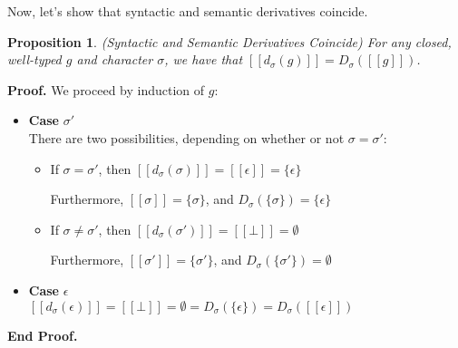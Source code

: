 \documentclass{article}
\newcommand{\interp}[1]{[\![{#1}]\!]}
\newcommand{\setof}[1]{\{{#1}\}}
\newcommand{\semderiv}[2]{D_{#1}({#2})}
\newcommand{\deriv}[2]{d_{#1}({#2})}
\newtheorem{prop}{Proposition}
\newenvironment{proof}{\noindent\textbf{Proof.}}
{\noindent\textbf{End Proof.}}
\newenvironment{caseblock}{\begin{itemize}}{\end{itemize}}
\newenvironment{case}[1]{\item \textbf{Case} {#1}\\}{}
\begin{document}
Now, let's show that syntactic and semantic derivatives coincide. 

\begin{prop}{(Syntactic and Semantic Derivatives Coincide)}
For any closed, well-typed $g$ and character $\sigma$, we have that
$\interp{\deriv{\sigma}{g}} = \semderiv{\sigma}{\interp{g}}$.
\end{prop}

\begin{proof}
  We proceed by induction of $g$: 

  \begin{caseblock}
    \begin{case}{$\sigma'$}
      There are two possibilities, depending on whether or not $\sigma = \sigma'$: 
      \begin{itemize}
        \item If $\sigma = \sigma'$, then $\interp{\deriv{\sigma}{\sigma}} = \interp{\epsilon} = \setof{\epsilon}$

          Furthermore, $\interp{\sigma} = \setof{\sigma}$, and $\semderiv{\sigma}{\setof{\sigma}} = \setof{\epsilon}$
        \item If $\sigma \not= \sigma'$, then $\interp{\deriv{\sigma}{\sigma'}} = \interp{\bot} = \emptyset$
          
          Furthermore, $\interp{\sigma'} = \setof{\sigma'}$, and $\semderiv{\sigma}{\setof{\sigma'}} = \emptyset$
      \end{itemize}
    \end{case}

    \begin{case}{$\epsilon$}
      $\interp{\deriv{\sigma}{\epsilon}} = \interp{\bot} = \emptyset = \semderiv{\sigma}{\setof{\epsilon}} = \semderiv{\sigma}{\interp{\epsilon}}$
    \end{case}


\end{caseblock}
\end{proof}
\end{document}
